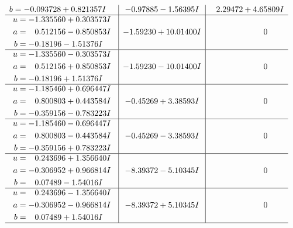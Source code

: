 \documentclass[1p]{elsarticle_modified}
\theoremstyle{definition}
\begin{document}
$$\begin{array}{c|c|c}
\begin{aligned}
b &= -0.093728 + 0.821357 I\end{aligned}
 & -0.97885 - 1.56395 I & \phantom{-}2.29472 + 4.65809 I \\ \hline\begin{aligned}
u &= -1.335560 + 0.303573 I \\
a &= \phantom{-}0.512156 - 0.850853 I \\
b &= -0.18196 - 1.51376 I\end{aligned}
 & -1.59230 + 10.01400 I & \phantom{-0.000000 } 0 \\ \hline\begin{aligned}
u &= -1.335560 - 0.303573 I \\
a &= \phantom{-}0.512156 + 0.850853 I \\
b &= -0.18196 + 1.51376 I\end{aligned}
 & -1.59230 - 10.01400 I & \phantom{-0.000000 } 0 \\ \hline\begin{aligned}
u &= -1.185460 + 0.696447 I \\
a &= \phantom{-}0.800803 + 0.443584 I \\
b &= -0.359156 - 0.783223 I\end{aligned}
 & -0.45269 + 3.38593 I & \phantom{-0.000000 } 0 \\ \hline\begin{aligned}
u &= -1.185460 - 0.696447 I \\
a &= \phantom{-}0.800803 - 0.443584 I \\
b &= -0.359156 + 0.783223 I\end{aligned}
 & -0.45269 - 3.38593 I & \phantom{-0.000000 } 0 \\ \hline\begin{aligned}
u &= \phantom{-}0.243696 + 1.356640 I \\
a &= -0.306952 + 0.966814 I \\
b &= \phantom{-}0.07489 - 1.54016 I\end{aligned}
 & -8.39372 - 5.10345 I & \phantom{-0.000000 } 0 \\ \hline\begin{aligned}
u &= \phantom{-}0.243696 - 1.356640 I \\
a &= -0.306952 - 0.966814 I \\
b &= \phantom{-}0.07489 + 1.54016 I\end{aligned}
 & -8.39372 + 5.10345 I & \phantom{-0.000000 } 0\\
 \hline 
 \end{array}$$\newpage$$\begin{array}{c|c|c}  

\end{array}$$
\end{document}
